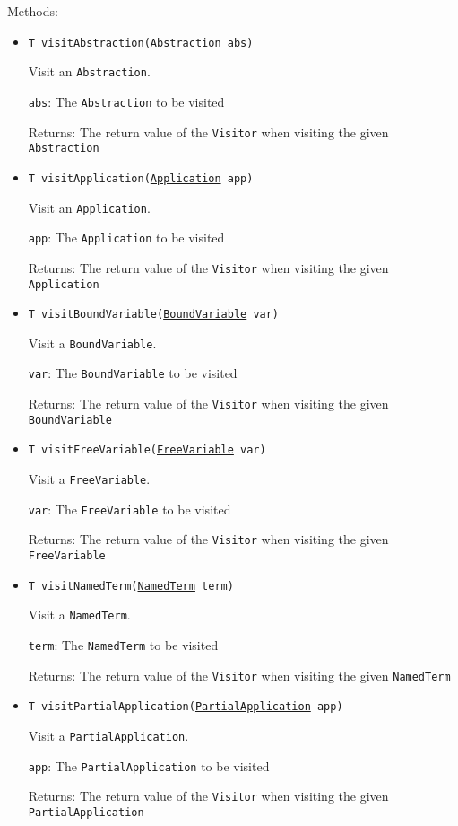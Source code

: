 Methods:
\begin{itemize}
\item \texttt{T visitAbstraction(\hyperref[type:edu.kit.wavelength.client.model.term.Abstraction]{Abstraction} abs)}

Visit an \texttt{Abstraction}.

\texttt{abs}: The \texttt{Abstraction} to be visited

Returns: The return value of the \texttt{Visitor} when visiting the given
         \texttt{Abstraction}

\item \texttt{T visitApplication(\hyperref[type:edu.kit.wavelength.client.model.term.Application]{Application} app)}

Visit an \texttt{Application}.

\texttt{app}: The \texttt{Application} to be visited

Returns: The return value of the \texttt{Visitor} when visiting the given
         \texttt{Application}

\item \texttt{T visitBoundVariable(\hyperref[type:edu.kit.wavelength.client.model.term.BoundVariable]{BoundVariable} var)}

Visit a \texttt{BoundVariable}.

\texttt{var}: The \texttt{BoundVariable} to be visited

Returns: The return value of the \texttt{Visitor} when visiting the given
         \texttt{BoundVariable}

\item \texttt{T visitFreeVariable(\hyperref[type:edu.kit.wavelength.client.model.term.FreeVariable]{FreeVariable} var)}

Visit a \texttt{FreeVariable}.

\texttt{var}: The \texttt{FreeVariable} to be visited

Returns: The return value of the \texttt{Visitor} when visiting the given
         \texttt{FreeVariable}

\item \texttt{T visitNamedTerm(\hyperref[type:edu.kit.wavelength.client.model.term.NamedTerm]{NamedTerm} term)}

Visit a \texttt{NamedTerm}.

\texttt{term}: The \texttt{NamedTerm} to be visited

Returns: The return value of the \texttt{Visitor} when visiting the given
         \texttt{NamedTerm}

\item \texttt{T visitPartialApplication(\hyperref[type:edu.kit.wavelength.client.model.term.PartialApplication]{PartialApplication} app)}

Visit a \texttt{PartialApplication}.

\texttt{app}: The \texttt{PartialApplication} to be visited

Returns: The return value of the \texttt{Visitor} when visiting the given
         \texttt{PartialApplication}

\end{itemize}

